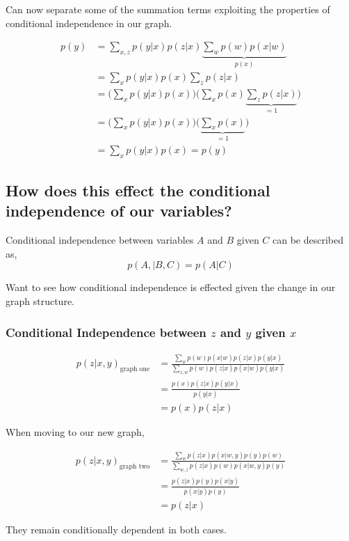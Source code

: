 \documentclass[11pt]{article}
\begin{document}
Can now separate some of the summation terms exploiting the properties of conditional independence in our graph.

\begin{align*}
p(y) & = \sum_{x,z} p(y|x) p(z|x) \underbrace{\sum_{w} p(w)p(x|w)}_{p(x)}
\\
& = \sum_{x} p(y|x) p(x) \sum_{z} p(z|x)
\\
& = \Big( \sum_{x} p(y|x) p(x) \Big) \Big( \sum_{x} p(x) \underbrace{\sum_{z} p(z|x)}_{=1} \Big)
\\
& = \Big(\sum_{x} p(y|x) p(x) \Big) \Big(\underbrace{\sum_{x} p(x)}_{=1} \Big)
\\
& = \sum_{x} p(y|x) p(x) = p(y)
\end{align*}


\subsection{How does this effect the conditional independence of our variables?}
\label{sec:orgae8a6b8}
Conditional independence between variables \(A\) and \(B\) given \(C\) can be described as,
\[ p(A, |B ,C ) = p(A | C) \]

Want to see how conditional independence is effected given the change in our graph structure.

\subsubsection{Conditional Independence between \(z\) and \(y\) given \(x\)}
\begin{align*}
p(z |x, y)_{\text{graph one}} &= \frac{\sum_{w}p(w)p(x | w)p(z | x)  p(y | x)} {\sum_{z,w} p(w)p(z | x) p(x | w) p(y | x)}
\\
&= \frac{p(x) p(z | x)  p(y | x)} { p(y | x)}
\\
&= p(x) p(z | x)
\end{align*}

When moving to our new graph,

\begin{align*}
p(z | x, y)_{\text{graph two}} &= \frac{\sum_{w}p(z | x)p(x | w, y) p(y)   p(w) } {\sum_{w,z}p(z | x) p(w) p(x | w, y) p(y)}
\\
&= \frac{p(z | x) p(y)  p(x | y) } { p(x|y) p(y)}
\\
&= p(z | x)
\end{align*}

They remain conditionally dependent in both cases.
\end{document}
